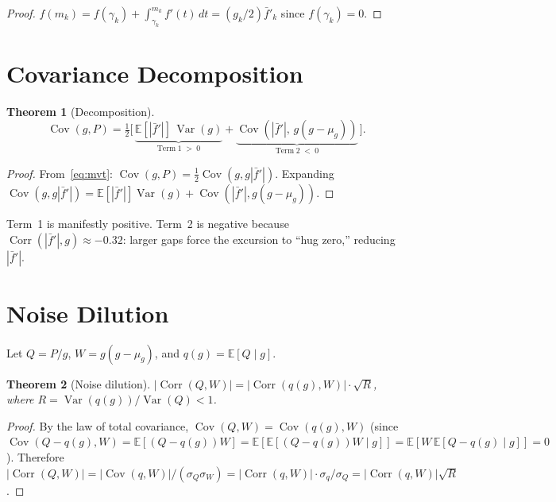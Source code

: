 \documentclass[11pt]{article}
\newtheorem{theorem}{Theorem}
\DeclareMathOperator{\Corr}{Corr}
\DeclareMathOperator{\Cov}{Cov}
\DeclareMathOperator{\Var}{Var}
\begin{document}
\begin{proof}
$f(m_k) = f(\gamma_k) + \int_{\gamma_k}^{m_k} f'(t)\,dt = (g_k/2)\bar{f}'_k$
since $f(\gamma_k) = 0$.
\end{proof}


\section{Covariance Decomposition}\label{sec:decomp}

\begin{theorem}[Decomposition]\label{thm:decomp}
\begin{equation}\label{eq:decomp}
\Cov(g, P) = \tfrac{1}{2}\bigl[\,
\underbrace{\mathbb{E}[|\bar{f}'|]\,\Var(g)}_{\mathrm{Term\;1}\;>\;0}
+ \underbrace{\Cov(|\bar{f}'|,\, g(g{-}\mu_g))}_{\mathrm{Term\;2}\;<\;0}
\,\bigr].
\end{equation}
\end{theorem}

\begin{proof}
From~\eqref{eq:mvt}: $\Cov(g,P) = \tfrac{1}{2}\Cov(g, g|\bar{f}'|)$.
Expanding $\Cov(g, g|\bar{f}'|) = \mathbb{E}[|\bar{f}'|]\Var(g) +
\Cov(|\bar{f}'|, g(g{-}\mu_g))$.
\end{proof}

Term~1 is manifestly positive.
Term~2 is negative because $\Corr(|\bar{f}'|, g) \approx -0.32$:
larger gaps force the excursion to ``hug zero,'' reducing $|\bar{f}'|$.


\section{Noise Dilution}\label{sec:noise}

Let $Q = P/g$, $W = g(g{-}\mu_g)$, and $q(g) = \mathbb{E}[Q \mid g]$.

\begin{theorem}[Noise dilution]\label{thm:noise}
$|\Corr(Q, W)| = |\Corr(q(g), W)| \cdot \sqrt{R}$,
where $R = \Var(q(g))/\Var(Q) < 1$.
\end{theorem}

\begin{proof}
By the law of total covariance,
$\Cov(Q, W) = \Cov(q(g), W)$
(since $\Cov(Q - q(g), W) = \mathbb{E}[(Q{-}q(g))W] =
\mathbb{E}[\mathbb{E}[(Q{-}q(g))W \mid g]] =
\mathbb{E}[W\,\mathbb{E}[Q{-}q(g)\mid g]] = 0$).
Therefore
$|\Corr(Q,W)| = |\Cov(q,W)|/(\sigma_Q\sigma_W) =
|\Corr(q,W)| \cdot \sigma_q/\sigma_Q = |\Corr(q,W)|\sqrt{R}$.
\end{proof}
\end{document}
